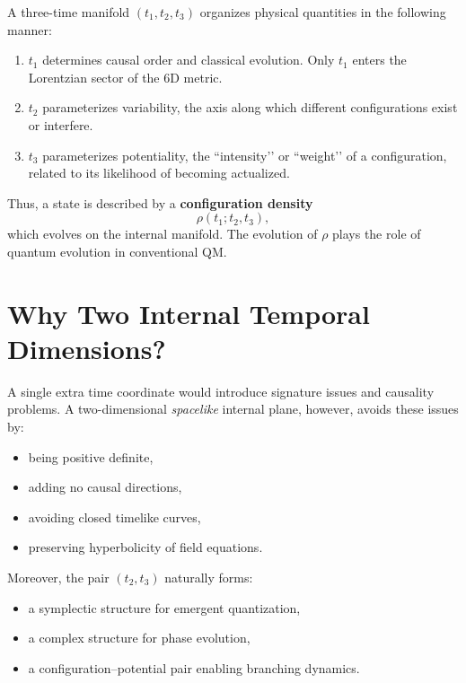 \documentclass[12pt]{article}
\begin{document}
A three-time manifold \((t_1, t_2, t_3)\) organizes physical quantities in the 
following manner:

\begin{enumerate}
\item \(t_1\) determines causal order and classical evolution. Only \(t_1\) enters 
the Lorentzian sector of the 6D metric.
\item \(t_2\) parameterizes variability, the axis along which different 
configurations exist or interfere.
\item \(t_3\) parameterizes potentiality, the “intensity’’ or “weight’’ of a 
configuration, related to its likelihood of becoming actualized.
\end{enumerate}

Thus, a state is described by a \textbf{configuration density}
\begin{equation}
\rho(t_1; t_2, t_3),
\end{equation}
which evolves on the internal manifold. The evolution of \(\rho\) plays the role 
of quantum evolution in conventional QM.


\newpage
\section{Why Two Internal Temporal Dimensions?}

A single extra time coordinate would introduce signature issues and causality 
problems. A two-dimensional \emph{spacelike} internal plane, however, avoids 
these issues by:
\begin{itemize}
\item being positive definite,
\item adding no causal directions,
\item avoiding closed timelike curves,
\item preserving hyperbolicity of field equations.
\end{itemize}

Moreover, the pair \((t_2,t_3)\) naturally forms:
\begin{itemize}
\item a symplectic structure for emergent quantization,
\item a complex structure for phase evolution,
\item a configuration–potential pair enabling branching dynamics.
\end{itemize}
\end{document}
